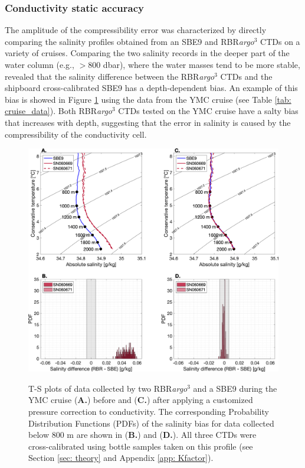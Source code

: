 \documentclass{ametsocV6.1}
\begin{document}
\subsubsection{Conductivity static accuracy}
\label{sec: static_results}
The amplitude of the compressibility error was characterized by directly comparing the salinity profiles obtained from an SBE9 and RBR\textit{argo}$^3$ CTDs on a variety of cruises.  
Comparing the two salinity records in the deeper part of the water column (e.g.,  $>$800 dbar),  where the water masses tend to be more stable,  revealed that the salinity difference between the RBR\textit{argo}$^3$ CTDs and the shipboard cross-calibrated SBE9 has a depth-dependent bias.  
An example of this bias is showed in Figure \ref{fig: YMC_data} using the data from the YMC cruise (see Table \ref{tab: cruise_data}).  
Both RBR\textit{argo}$^3$ CTDs tested on the YMC cruise have a salty bias that increases with depth,  suggesting that the error in salinity is caused by the compressibility of the conductivity cell. 

\begin{figure}[t]
	\includegraphics[width = \linewidth]{Fig4_compression_errors_YMC.png}\\
	\caption{T-S plots of data collected by two RBR\textit{argo}$^3$ and a SBE9 during the YMC cruise \citep[station 4; ][]{YMCreport_2019} (\textbf{A.}) before and (\textbf{C.}) after applying a customized pressure correction to conductivity. The corresponding Probability Distribution Functions (PDFs) of the salinity bias for data collected below 800 m are shown in (\textbf{B.}) and (\textbf{D.}).  All three CTDs were cross-calibrated using bottle samples taken on this profile (see Section \ref{sec: theory} and Appendix \ref{app: Kfactor}).}
	\label{fig: YMC_data}
\end{figure}
\end{document}

